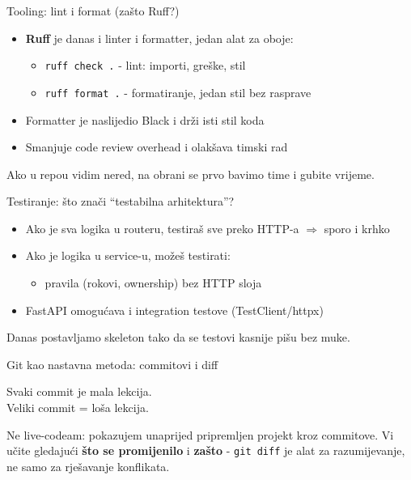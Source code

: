 \begin{frame}{Tooling: lint i format (zašto Ruff?)}
\begin{itemize}
  \item \textbf{Ruff} je danas i linter i formatter, jedan alat za oboje:
  \begin{itemize}
    \item \texttt{ruff check .} - lint: importi, greške, stil
    \item \texttt{ruff format .} - formatiranje, jedan stil bez rasprave
  \end{itemize}
  \item Formatter je naslijedio Black i drži isti stil koda
  \item Smanjuje code review overhead i olakšava timski rad
\end{itemize}

\vspace{0.6em}
Ako u repou vidim nered, na obrani se prvo bavimo time i gubite vrijeme.
\end{frame}

\begin{frame}{Testiranje: što znači \enquote{testabilna arhitektura}?}
\begin{itemize}
  \item Ako je sva logika u routeru, testiraš sve preko HTTP-a $\Rightarrow$ sporo i krhko
  \item Ako je logika u service-u, možeš testirati:
  \begin{itemize}
    \item pravila (rokovi, ownership) bez HTTP sloja
  \end{itemize}
  \item FastAPI omogućava i integration testove (TestClient/httpx)
\end{itemize}

\vspace{0.6em}
Danas postavljamo skeleton tako da se testovi kasnije pišu bez muke.
\end{frame}

\begin{frame}{Git kao nastavna metoda: commitovi i diff}
\begin{center}
\Large Svaki commit je mala lekcija. \\[0.3em] Veliki commit = loša lekcija.
\end{center}

\vspace{0.8em}
Ne live-codeam: pokazujem unaprijed pripremljen projekt kroz commitove. Vi učite gledajući \textbf{što se promijenilo} i \textbf{zašto} - \texttt{git diff} je alat za razumijevanje, ne samo za rješavanje konflikata.
\end{frame}

